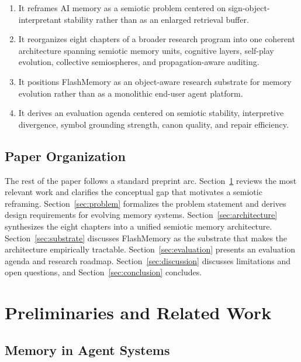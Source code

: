 \documentclass[11pt]{article}
\begin{document}
\begin{enumerate}
  \item It reframes AI memory as a semiotic problem centered on sign-object-interpretant stability rather than as an enlarged retrieval buffer.
  \item It reorganizes eight chapters of a broader research program into one coherent architecture spanning semiotic memory units, cognitive layers, self-play evolution, collective semiospheres, and propagation-aware auditing.
  \item It positions FlashMemory as an object-aware research substrate for memory evolution rather than as a monolithic end-user agent platform.
  \item It derives an evaluation agenda centered on semiotic stability, interpretive divergence, symbol grounding strength, canon quality, and repair efficiency.
\end{enumerate}

\subsection{Paper Organization}

The rest of the paper follows a standard preprint arc. Section~\ref{sec:related} reviews the most relevant work and clarifies the conceptual gap that motivates a semiotic reframing. Section~\ref{sec:problem} formalizes the problem statement and derives design requirements for evolving memory systems. Section~\ref{sec:architecture} synthesizes the eight chapters into a unified semiotic memory architecture. Section~\ref{sec:substrate} discusses FlashMemory as the substrate that makes the architecture empirically tractable. Section~\ref{sec:evaluation} presents an evaluation agenda and research roadmap. Section~\ref{sec:discussion} discusses limitations and open questions, and Section~\ref{sec:conclusion} concludes.

\section{Preliminaries and Related Work}
\label{sec:related}

\subsection{Memory in Agent Systems}
\end{document}

